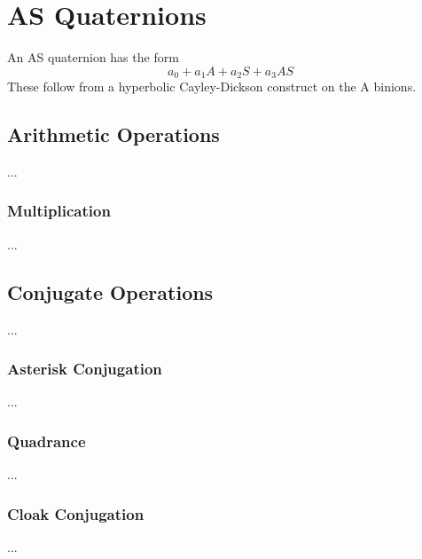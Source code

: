 \chapter{AS Quaternions}
An AS quaternion has the form
\begin{equation}
    a_{0} + a_{1} A + a_{2} S + a_{3} AS
\end{equation}
These follow from a hyperbolic Cayley-Dickson construct on the A binions.
\section{Arithmetic Operations}
...
\subsection{Multiplication}
...
\section{Conjugate Operations}
...
\subsection{Asterisk Conjugation}
...
\subsection{Quadrance}
...
\subsection{Cloak Conjugation}
...
